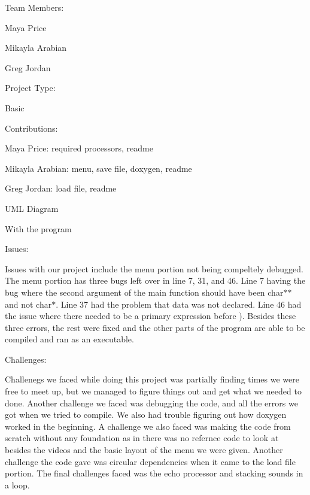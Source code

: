 Team Members\+:
\begin{DoxyItemize}
\item Maya Price
\item Mikayla Arabian
\item Greg Jordan
\end{DoxyItemize}

Project Type\+:
\begin{DoxyItemize}
\item Basic
\end{DoxyItemize}

Contributions\+:
\begin{DoxyItemize}
\item Maya Price\+: required processors, readme
\item Mikayla Arabian\+: menu, save file, doxygen, readme
\item Greg Jordan\+: load file, readme
\end{DoxyItemize}

U\+ML Diagram
\begin{DoxyItemize}
\item With the program
\end{DoxyItemize}

Issues\+:
\begin{DoxyItemize}
\item Issues with our project include the menu portion not being compeltely debugged. The menu portion has three bugs left over in line 7, 31, and 46. Line 7 having the bug where the second argument of the main function should have been char$\ast$$\ast$ and not char$\ast$. Line 37 had the problem that data was not declared. Line 46 had the issue where there needed to be a primary expression before \textquotesingle{})\textquotesingle{}. Besides these three errors, the rest were fixed and the other parts of the program are able to be compiled and ran as an executable.
\end{DoxyItemize}

Challenges\+:
\begin{DoxyItemize}
\item Challenegs we faced while doing this project was partially finding times we were free to meet up, but we managed to figure things out and get what we needed to done. Another challenge we faced was debugging the code, and all the errors we got when we tried to compile. We also had trouble figuring out how doxygen worked in the beginning. A challenge we also faced was making the code from scratch without any foundation as in there was no refernce code to look at besides the videos and the basic layout of the menu we were given. Another challenge the code gave was circular dependencies when it came to the load file portion. The final challenges faced was the echo processor and stacking sounds in a loop.
\end{DoxyItemize}

